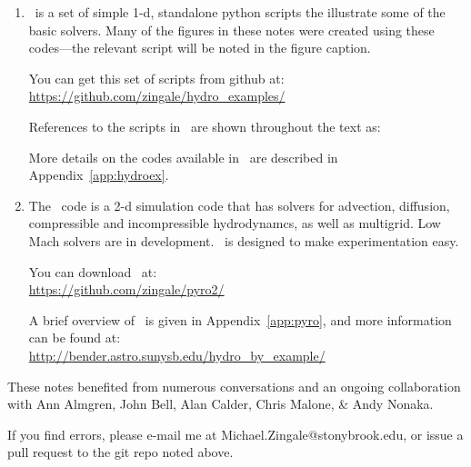 \begin{enumerate}
\item \hydroex\ is a set of simple 1-d, standalone python scripts
  the illustrate some of the basic solvers.  Many of the figures
  in these notes were created using these codes---the relevant
  script will be noted in the figure caption.  

  You can get this set of scripts from github at:\\
  \url{https://github.com/zingale/hydro_examples/}

  References to the scripts in \hydroex\ are shown throughout
  the text as: \\[0.5em]

  More details on the codes available in \hydroex\ are described
  in Appendix~\ref{app:hydroex}.

\item  
  The \pyro\ code is a 2-d simulation code that has
  solvers for advection, diffusion, compressible and incompressible
  hydrodynamcs, as well as multigrid.  Low Mach solvers are 
  in development.  \pyro\ is designed to make 
  experimentation easy.  

  You can download \pyro\ at: \\
  \url{https://github.com/zingale/pyro2/} 

  A brief overview of \pyro\ is given in Appendix~\ref{app:pyro},
  and more information can be found at: \\
\url{http://bender.astro.sunysb.edu/hydro_by_example/}
\end{enumerate}

These notes benefited from numerous conversations and an ongoing
collaboration with Ann Almgren, John Bell, Alan Calder, Chris
Malone, \& Andy Nonaka.

If you find errors, please e-mail me at Michael.Zingale@stonybrook.edu,
or issue a pull request to the git repo noted above.
